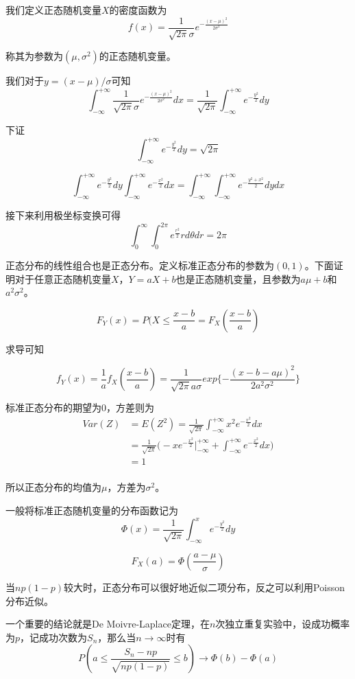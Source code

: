 \documentclass[UTF8]{ctexart}
\begin{document}
我们定义正态随机变量$X$的密度函数为
$$f(x)=\frac{1}{\sqrt{2\pi} \sigma} e^{-\frac{(x-\mu )^{2}}{2\sigma^{2}}} $$

称其为参数为$(\mu ,\sigma^{2})$的正态随机变量。

我们对于$y=(x-\mu )/\sigma $可知
$$\int_{-\infty }^{+\infty }\frac{1}{\sqrt{2\pi} \sigma} e^{-\frac{(x-\mu )^{2}}{2\sigma^{2}}} dx=\frac{1}{\sqrt{2\pi }}\int_{-\infty }^{+\infty } e^{-\frac{y^{2}}{2}}dy $$

下证
$$\int_{-\infty }^{+\infty } e^{-\frac{y^{2}}{2}}dy=\sqrt{2\pi } $$

$$\int_{-\infty }^{+\infty } e^{-\frac{y^{2}}{2}}dy\int_{-\infty }^{+\infty } e^{-\frac{x^{2}}{2}}dx=\int_{-\infty }^{+\infty }\int_{-\infty }^{+\infty } e^{-\frac{y^{2}+x^{2}}{2}}dydx $$

接下来利用极坐标变换可得
$$\int_{0}^{\infty }\int_{0}^{2\pi } e^{\frac{r^{2}}{2}} rd\theta dr=2\pi $$

正态分布的线性组合也是正态分布。定义标准正态分布的参数为$(0,1)$。下面证明对于任意正态随机变量$X$，$Y=aX+b$也是正态随机变量，且参数为$a\mu +b$和$a^{2}\sigma^{2} $。

$$F_{Y}(x)=P(X\leq \frac{x-b}{a}=F_{X}(\frac{x-b}{a}) $$

求导可知

$$f_{Y}(x)=\frac{1}{a}f_{X}(\frac{x-b}{a})=\frac{1}{\sqrt{2\pi }a\sigma }exp\{-\frac{(x-b-a\mu )^{2}}{2a^{2}\sigma^{2} } \} $$

标准正态分布的期望为$0$，方差则为
$$\begin{aligned}
Var(Z)&=E(Z^{2})=\frac{1}{\sqrt{2\pi }}\int_{-\infty }^{+\infty }x^{2}e^{-\frac{x^{2}}{2}} dx\\
&=\frac{1}{\sqrt{2\pi }}\Big(-xe^{-\frac{x^{2}}{2}}\Big|_{-\infty }^{+\infty} +\int_{-\infty }^{+\infty }e^{-\frac{x^{2}}{2}} dx\Big)\\
&=1\\
\end{aligned} $$

所以正态分布的均值为$\mu $，方差为$\sigma^{2} $。

一般将标准正态随机变量的分布函数记为
$$\Phi (x)=\frac{1}{\sqrt{2\pi }} \int_{-\infty }^{x}e^{-\frac{y^{2}}{2}} dy$$

$$F_{X}(a)=\Phi (\frac{a-\mu }{\sigma }) $$

当$np(1-p)$较大时，正态分布可以很好地近似二项分布，反之可以利用Poisson分布近似。

一个重要的结论就是De Moivre-Laplace定理，在$n$次独立重复实验中，设成功概率为$p$，记成功次数为$S_{n}$，那么当$n\to \infty $时有
$$P(a\leq \frac{S_{n}-np}{\sqrt{np(1-p)}} \leq b)\to \Phi (b)-\Phi (a) $$
\end{document}
